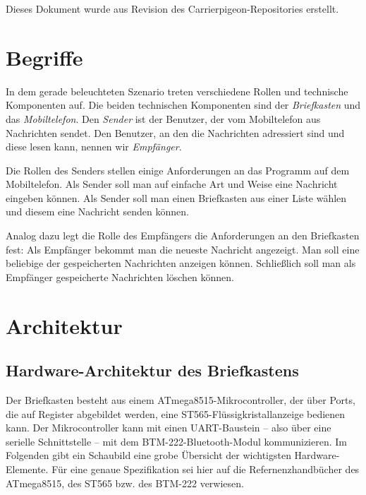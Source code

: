 \documentclass[ngerman]{article}
\begin{document}
Dieses Dokument wurde aus Revision \texttt{} des
Carrierpigeon-Repositories erstellt.

\section{Begriffe}

In dem gerade beleuchteten Szenario treten verschiedene Rollen und technische
Komponenten auf. Die beiden technischen Komponenten sind der
\textit{Briefkasten} und das \textit{Mobiltelefon}. Den \textit{Sender} ist der
Benutzer, der vom Mobiltelefon aus Nachrichten sendet. Den Benutzer, an den die
Nachrichten adressiert sind und diese lesen kann, nennen wir
\textit{Empfänger}.

Die Rollen des Senders stellen einige Anforderungen an das Programm auf dem
Mobiltelefon. Als Sender soll man auf einfache Art und Weise eine Nachricht
eingeben können. Als Sender soll man einen Briefkasten aus einer Liste wählen
und diesem eine Nachricht senden können.

Analog dazu legt die Rolle des Empfängers die Anforderungen an den Briefkasten
fest: Als Empfänger bekommt man die neueste Nachricht an\-gezeigt. Man soll
eine beliebige der gespeicherten Nachrichten anzeigen können. Schließlich soll
man als Empfänger gespeicherte Nachrichten löschen können.

\section{Architektur}

\subsection{Hardware-Architektur des Briefkastens}

Der Briefkasten besteht aus einem ATmega8515-Mikrocontroller, der über Ports,
die auf Register abgebildet werden, eine ST565-Flüssigkristallanzeige bedienen
kann. Der Mikrocontroller kann mit einen UART-Baustein -- also über eine serielle
Schnittstelle -- mit dem BTM-222-Bluetooth-Modul kommunizieren. Im Folgenden
gibt ein Schaubild eine grobe Übersicht der wichtigsten Hardware-Elemente. Für
eine genaue Spezifikation sei hier auf die Refernenzhandbücher des ATmega8515,
des ST565 bzw. des BTM-222 verwiesen.
\end{document}

